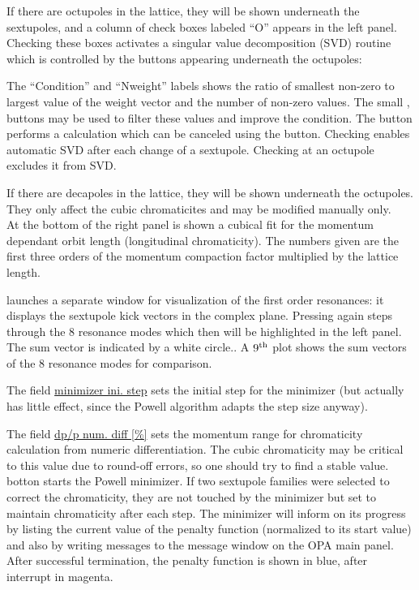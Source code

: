 \documentclass[12pt]{article}
\newcommand\button[1]{\fbox{\small\bf #1}}
\newcommand\chkbox[1]{\fbox{\small $\circ\,$#1}}
\newcommand\field[1]{\underline{\small #1}}
\begin{document}
If there are octupoles in the lattice, they will be shown underneath the sextupoles, and a column of check boxes labeled ``O'' appears in the left panel. 
Checking these boxes activates
a singular value decomposition (SVD) routine which is controlled
by the buttons appearing underneath the octupoles:

The ``Condition'' and ``Nweight''
labels shows the ratio of smallest non-zero to largest value of the weight vector
and the number of non-zero values. The small \button{$+$}, \button{$-$}  buttons may be used to filter these values and improve the condition. 
The \button{SVD} button performs a calculation which
can be canceled using the \button{undo} button. 
Checking  \chkbox{auto} enables automatic SVD after each change of a sextupole. Checking \chkbox{lock} at an octupole excludes it from SVD.

If there are decapoles in the lattice, they will be shown underneath the octupoles. They only affect the cubic chromaticites and may be modified manually only.\\

At the bottom of the right panel is shown a
cubical fit for the momentum dependant orbit length (longitudinal chromaticity). The numbers given are the first three orders of the momentum
compaction factor multiplied by the lattice length.

\button{select} launches a separate window for visualization of the first order resonances: it displays the sextupole kick vectors in the complex plane. Pressing again steps through the 8 resonance modes which then will be highlighted in the left panel. The sum vector is indicated by a white circle.. A $9^{\rm th}$ plot shows the sum vectors of the 8 resonance modes for comparison.

The field \field{minimizer ini. step} sets the initial step for the minimizer (but actually has little effect, since the Powell algorithm adapts the step size anyway).

The field \field{dp/p num. diff [\%]} sets the momentum range for chromaticity calculation from numeric differentiation. The cubic chromaticity may be critical to this value due to round-off errors, so one should try to find a stable value.\\

\button{Start} botton starts the Powell minimizer.
If two sextupole families were selected to correct the chromaticity, they are not touched by the minimizer but set to maintain chromaticity after each step.
The minimizer will inform on its progress by listing the current
value of the penalty function (normalized to its start value) and
also by writing messages to the message window on the OPA main panel.
After successful termination, the penalty function is shown in blue, after
interrupt in magenta.
\end{document}

